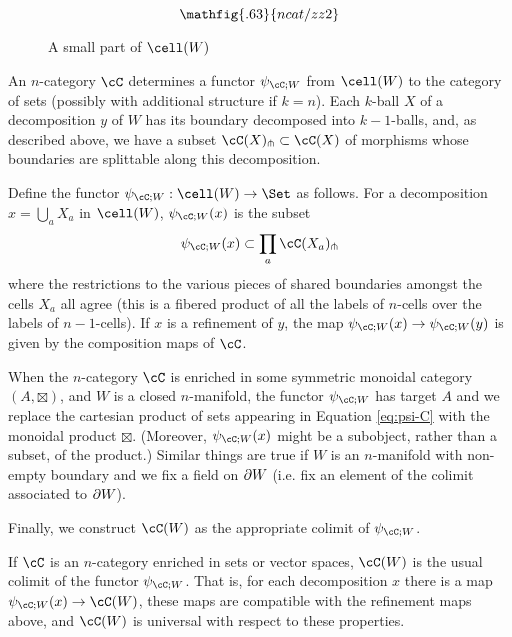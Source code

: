 \begin{figure}[!ht]
\begin{equation*}
\mathfig{.63}{ncat/zz2}
\end{equation*}
\caption{A small part of $\cell(W)$}
\label{partofJfig}
\end{figure}



An $n$-category $\cC$ determines 
a functor $\psi_{\cC;W}$ from $\cell(W)$ to the category of sets 
(possibly with additional structure if $k=n$).
Each $k$-ball $X$ of a decomposition $y$ of $W$ has its boundary decomposed into $k{-}1$-balls,
and, as described above, we have a subset $\cC(X)\spl \sub \cC(X)$ of morphisms whose boundaries
are splittable along this decomposition.

\begin{defn}
Define the functor $\psi_{\cC;W} : \cell(W) \to \Set$ as follows.
For a decomposition $x = \bigcup_a X_a$ in $\cell(W)$, $\psi_{\cC;W}(x)$ is the subset
\begin{equation}
\label{eq:psi-C}
	\psi_{\cC;W}(x) \sub \prod_a \cC(X_a)\spl
\end{equation}
where the restrictions to the various pieces of shared boundaries amongst the cells
$X_a$ all agree (this is a fibered product of all the labels of $n$-cells over the labels of $n-1$-cells).
If $x$ is a refinement of $y$, the map $\psi_{\cC;W}(x) \to \psi_{\cC;W}(y)$ is given by the composition maps of $\cC$.
\end{defn}

When the $n$-category $\cC$ is enriched in some symmetric monoidal category $(A,\boxtimes)$, and $W$ is a
closed $n$-manifold, the functor $\psi_{\cC;W}$ has target $A$ and
we replace the cartesian product of sets appearing in Equation \eqref{eq:psi-C} with the monoidal product $\boxtimes$. 
(Moreover, $\psi_{\cC;W}(x)$ might be a subobject, rather than a subset, of the product.)
Similar things are true if $W$ is an $n$-manifold with non-empty boundary and we
fix a field on $\partial W$
(i.e. fix an element of the colimit associated to $\partial W$).

Finally, we construct $\cC(W)$ as the appropriate colimit of $\psi_{\cC;W}$.

\begin{defn}
If $\cC$ is an $n$-category enriched in sets or vector spaces, $\cC(W)$ is the usual colimit of the functor $\psi_{\cC;W}$.
That is, for each decomposition $x$ there is a map
$\psi_{\cC;W}(x)\to \cC(W)$, these maps are compatible with the refinement maps
above, and $\cC(W)$ is universal with respect to these properties.
\end{defn}

